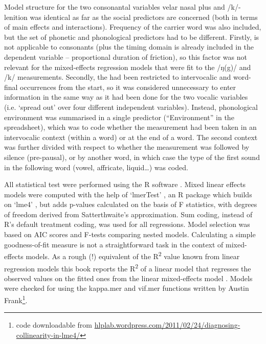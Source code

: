Model structure for the two consonantal variables velar nasal plus and /k/-lenition was identical as far as the social predictors are concerned (both in terms of main effects and interactions).
Frequency of the carrier word was also included, but the set of phonetic and phonological predictors had to be different.
Firstly,  is not applicable to consonants (plus the timing domain is already included in the dependent variable -- proportional duration of friction), so this factor was not relevant for the mixed-effects regression models that were fit to the /ŋ(g)/ and /k/ measurements.
Secondly, the  had been restricted to intervocalic and word-final occurrences from the start, so it was considered unnecessary to enter information in the same way as it had been done for the two vocalic variables (i.e. `spread out' over four different independent variables).
Instead, phonological environment was summarised in a single predictor (``Environment'' in the spreadsheet), which was to code whether the measurement had been taken in an intervocalic context (within a word) or at the end of a word.
The second context was further divided with respect to whether the measurement was followed by silence (pre-pausal), or by another word, in which case the type of the first sound in the following word (vowel, affricate, liquid\ldots) was coded.

All statistical test were performed using the R software \parencite{R}.
Mixed linear effects models were computed with the help of `lmerTest' \parencite{lmerTest}, an R package which builds on `lme4' \parencite{lme4}, but adds p-values calculated on the basis of F statistics, with degrees of freedom derived from Satterthwaite's approximation.
Sum coding, instead of R's default treatment coding, was used for all regressions.
Model selection was based on AIC scores and F-tests comparing nested models.
Calculating a simple goodness-of-fit measure is not a straightforward task in the context of mixed-effects models.
As a rough (!) equivalent of the R\textsuperscript{2} value known from linear regression models this book reports the R\textsuperscript{2} of a linear model that regresses the observed values on the fitted ones from the linear mixed-effects model \parencite[cf.][]{glmwiki}.
Models were checked for  using the kappa.mer and vif.mer functions written by Austin Frank\footnote{code downloadable from \url{hlplab.wordpress.com/2011/02/24/diagnosing-collinearity-in-lme4/}}.